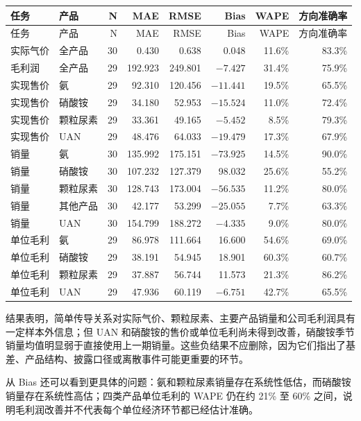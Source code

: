 \documentclass[11pt,a4paper]{ctexart}
\begin{document}
\scriptsize
\begin{longtable}{L{2.1cm}L{2.4cm}r r r r r r}
\toprule
任务 & 产品 & N & MAE & RMSE & Bias & WAPE & 方向准确率 \\
\midrule
\endfirsthead
\toprule
任务 & 产品 & N & MAE & RMSE & Bias & WAPE & 方向准确率 \\
\midrule
\endhead
实际气价 & 全产品 & 30 & 0.430 & 0.638 & 0.048 & 11.6\% & 83.3\% \\
毛利润 & 全产品 & 29 & 192.923 & 249.801 & $-7.427$ & 31.4\% & 75.9\% \\
实现售价 & 氨 & 29 & 92.310 & 120.456 & $-11.441$ & 19.5\% & 65.5\% \\
实现售价 & 硝酸铵 & 29 & 34.180 & 52.953 & $-15.524$ & 11.0\% & 72.4\% \\
实现售价 & 颗粒尿素 & 29 & 33.361 & 49.165 & $-5.452$ & 8.5\% & 79.3\% \\
实现售价 & UAN & 29 & 48.476 & 64.033 & $-19.479$ & 17.3\% & 67.9\% \\
销量 & 氨 & 30 & 135.992 & 175.151 & $-73.925$ & 14.5\% & 90.0\% \\
销量 & 硝酸铵 & 30 & 107.232 & 127.379 & 98.032 & 25.6\% & 55.2\% \\
销量 & 颗粒尿素 & 30 & 128.743 & 173.004 & $-56.535$ & 11.2\% & 80.0\% \\
销量 & 其他产品 & 30 & 42.177 & 53.299 & $-25.055$ & 7.7\% & 63.3\% \\
销量 & UAN & 30 & 154.799 & 188.272 & $-4.335$ & 9.0\% & 80.0\% \\
单位毛利 & 氨 & 29 & 86.978 & 111.664 & 16.600 & 54.6\% & 69.0\% \\
单位毛利 & 硝酸铵 & 29 & 38.191 & 54.945 & 18.901 & 60.3\% & 60.7\% \\
单位毛利 & 颗粒尿素 & 29 & 37.887 & 56.744 & 11.573 & 21.3\% & 86.2\% \\
单位毛利 & UAN & 29 & 47.936 & 60.119 & $-6.751$ & 42.7\% & 65.5\% \\
\bottomrule
\end{longtable}
\normalsize

结果表明，简单传导关系对实际气价、颗粒尿素、主要产品销量和公司毛利润具有一定样本外信息；但 UAN 和硝酸铵的售价或单位毛利尚未得到改善，硝酸铵季节销量均值明显弱于直接使用上一期销量。这些负结果不应删除，因为它们指出了基差、产品结构、披露口径或离散事件可能更重要的环节。

从 Bias 还可以看到更具体的问题：氨和颗粒尿素销量存在系统性低估，而硝酸铵销量存在系统性高估；四类产品单位毛利的 WAPE 仍在约 21\% 至 60\% 之间，说明毛利润改善并不代表每个单位经济环节都已经估计准确。
\end{document}
